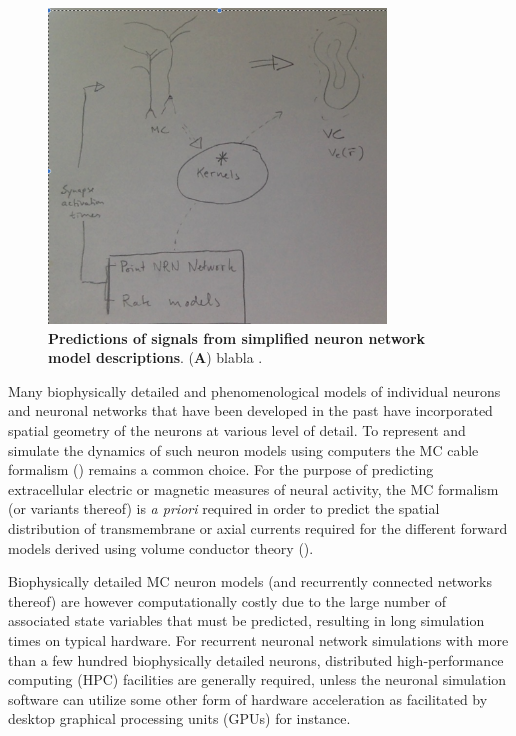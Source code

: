 \begin{figure}[!ht]
\begin{center}
\includegraphics[width=0.8\textwidth]{Figures/Ch-LFPy/Ch-LFPy-geirsketch}
\end{center}
\caption{\textbf{Predictions of signals from simplified neuron network model descriptions}.
({\bf A}) blabla
.
}
\label{fig:LFPy_circuits}
\end{figure}


Many biophysically detailed and phenomenological models of individual neurons and neuronal networks that have been developed in the past have incorporated spatial geometry of the neurons at various level of detail.
To represent and simulate the dynamics of such neuron models using computers the MC cable formalism () remains a common choice.
For the purpose of predicting extracellular electric or magnetic measures of neural activity,
the MC formalism (or variants thereof) is \emph{a priori} required in order to predict the spatial distribution of transmembrane or axial currents required for the different forward models derived using volume conductor theory ().

Biophysically detailed MC neuron models (and recurrently connected networks thereof) are however computationally costly due to the large number of associated state variables that must be predicted,
resulting in long simulation times on typical hardware.
For recurrent neuronal network simulations with more than a few hundred biophysically detailed neurons, distributed high-performance computing (HPC) facilities are generally required,
unless the neuronal simulation software can utilize some other form of hardware acceleration as facilitated by desktop graphical processing units (GPUs) for instance.

